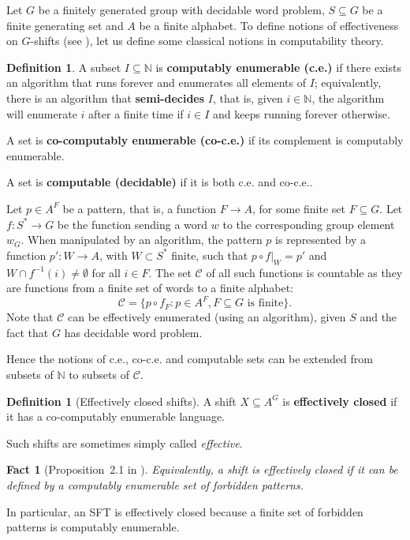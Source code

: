 \documentclass[french,american]{article}
\theoremstyle{plain}
\theoremstyle{definition}
\newtheorem{definition}[theorem]{Definition}
\theoremstyle{remark}
\theoremstyle{plain}
\newtheorem{fact}[theorem]{Fact}
\begin{document}
Let $G$ be a finitely generated group with decidable word problem,
$S\subseteq G$ be a finite generating set and $A$ be a finite alphabet.
To define notions of effectiveness on $G$-shifts (see \cite{Hochman2009}),
let us define some classical notions in computability theory.
\begin{definition}
A subset $I\subseteq\mathbb{N}$ is \textbf{computably enumerable
(c.e.)} if there exists an algorithm that runs forever and enumerates
all elements of $I$; equivalently, there is an algorithm that \textbf{semi-decides} $I$, that is, given $i\in \mathbb{N}$, the algorithm will enumerate $i$ after a finite time if $i\in I$ and keeps running forever otherwise.

A set is \textbf{co-computably enumerable (co-c.e.)} if its complement
is computably enumerable. 

A set is \textbf{computable (decidable)} if it is both c.e. and co-c.e..
\end{definition}

Let $p\in A^{F}$ be a pattern, that is, a function $F\rightarrow A$, for some finite set $F\subseteq G$. Let $f:S^{*}\rightarrow G$
be the function sending a word $w$ to the corresponding group element
$w_{G}$.
When manipulated by an algorithm, the pattern $p$ is represented by a function $p':W\rightarrow A$, with $W\subset S^*$ finite, such that $p\circ f|_W = p'$ and $W\cap f^{-1}(i)\neq \emptyset$ for all $i\in F$.
The set $\mathcal{C}$ of all such functions is countable as they
are functions from a finite set of words to a finite alphabet:
\[
\mathcal{C}=\{p\circ f_{F}:p\in A^{F},F\subseteq G\text{ is finite}\}.
\]
Note that $\mathcal{C}$ can be effectively enumerated (using an algorithm),
given $S$ and the fact that $G$ has  decidable word problem.

Hence the notions of c.e., co-c.e. and computable sets can be extended
from subsets of $\mathbb{N}$ to subsets of $\mathcal{C}$.

\begin{definition}[Effectively closed shifts]
A shift $X\subseteq A^{G}$ is \textbf{effectively closed} if it has a co-computably enumerable language.
\end{definition}

Such shifts are sometimes simply called \emph{effective}.

\begin{fact}[Proposition~2.1 in \cite{aubrun2018domino}]\label{fact:effective-altdef}
Equivalently, a shift is effectively closed if it can be defined by a computably enumerable set of forbidden patterns.
\end{fact}
In particular, an SFT is effectively closed because a finite set of forbidden patterns is computably enumerable.
\end{document}
